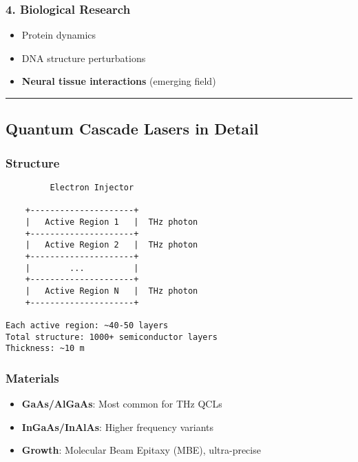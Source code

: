 \subsubsection{\texorpdfstring{4. \textbf{Biological
Research}}{4. Biological Research}}\label{biological-research}

\begin{itemize}
\tightlist
\item
  Protein dynamics
\item
  DNA structure perturbations
\item
  \textbf{Neural tissue interactions} (emerging field)
\end{itemize}

\begin{center}\rule{0.5\linewidth}{0.5pt}\end{center}

\subsection{Quantum Cascade Lasers in
Detail}\label{quantum-cascade-lasers-in-detail}

\subsubsection{Structure}\label{structure}

\begin{verbatim}
         Electron Injector
              
    +---------------------+
    |   Active Region 1   |  THz photon
    +---------------------+
    |   Active Region 2   |  THz photon
    +---------------------+
    |        ...          |
    +---------------------+
    |   Active Region N   |  THz photon
    +---------------------+

Each active region: ~40-50 layers
Total structure: 1000+ semiconductor layers
Thickness: ~10 m
\end{verbatim}

\subsubsection{Materials}\label{materials}

\begin{itemize}
\tightlist
\item
  \textbf{GaAs/AlGaAs}: Most common for THz QCLs
\item
  \textbf{InGaAs/InAlAs}: Higher frequency variants
\item
  \textbf{Growth}: Molecular Beam Epitaxy (MBE), ultra-precise
\end{itemize}

